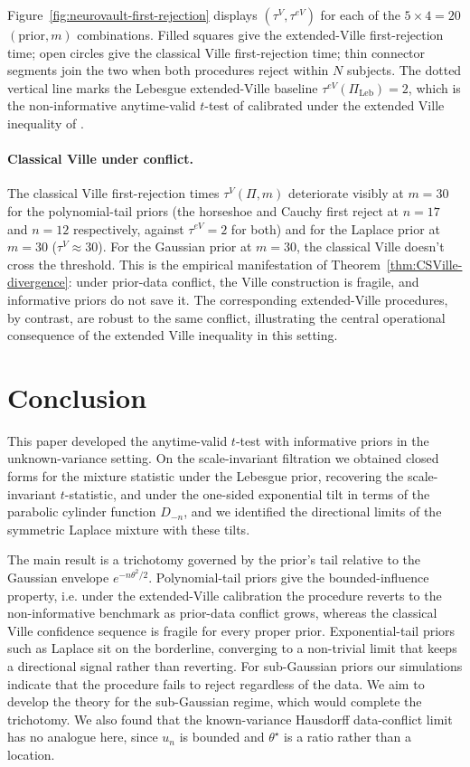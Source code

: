 \documentclass[numsec,webpdf,modern,medium,namedate]{oup-authoring-template}
\theoremstyle{thmstyleone}%
\theoremstyle{thmstyletwo}%
\theoremstyle{thmstylethree}%
\newcommand{\1}{\mathbf{1}}
\begin{document}
Figure~\ref{fig:neurovault-first-rejection} displays
$(\tau^{V}, \tau^{eV})$ for each of the $5 \times 4 = 20$
$(\text{prior}, m)$ combinations. Filled squares give the extended-Ville first-rejection time; open circles give the classical Ville first-rejection time; thin connector segments join the two when both procedures reject within $N$ subjects. The dotted vertical line marks the Lebesgue extended-Ville baseline $\tau^{eV}(\Pi_{\mathrm{Leb}}) = 2$, which is the non-informative anytime-valid $t$-test of \cite{Lai1976} calibrated under the extended Ville inequality of \cite{wang2025extended}.

\paragraph{Classical Ville under conflict.}
The classical Ville first-rejection times $\tau^{V}(\Pi, m)$ deteriorate visibly at $m = 30$ for the polynomial-tail priors (the
horseshoe and Cauchy first reject at $n = 17$ and $n = 12$ respectively, against $\tau^{eV} = 2$ for both) and for the Laplace prior at $m = 30$ ($\tau^{V} \approx 30$). For the Gaussian prior at $m=30$, the classical Ville doesn't cross the threshold. This is the empirical manifestation of Theorem~\ref{thm:CSVille-divergence}: under prior-data conflict, the Ville construction is fragile, and informative priors do not save it. The corresponding extended-Ville procedures, by contrast, are robust to the same conflict, illustrating the central operational consequence of the extended Ville inequality in this setting.



\section{Conclusion}

This paper developed the anytime-valid $t$-test with informative priors in the
unknown-variance setting. On the scale-invariant filtration we obtained closed
forms for the mixture statistic under the Lebesgue prior, recovering the
scale-invariant $t$-statistic, and under the one-sided exponential tilt in terms
of the parabolic cylinder function $D_{-n}$, and we identified the directional
limits of the symmetric Laplace mixture with these tilts.

The main result is a trichotomy governed by the prior's tail relative to the
Gaussian envelope $e^{-n\theta^2/2}$. Polynomial-tail priors give the
bounded-influence property, i.e. under the extended-Ville calibration the procedure reverts to the non-informative benchmark as prior-data conflict grows, whereas the classical Ville confidence sequence is fragile for every proper prior. Exponential-tail priors such as Laplace sit on the borderline, converging to a non-trivial limit that keeps a directional signal rather than reverting. For sub-Gaussian priors our
simulations indicate that the procedure fails to reject regardless of the data. We
aim to develop the theory for the sub-Gaussian regime, which would complete the trichotomy. We also found that the known-variance Hausdorff data-conflict limit has no analogue here, since $u_n$ is bounded and $\theta^\star$ is a ratio rather than a location.
\end{document}

